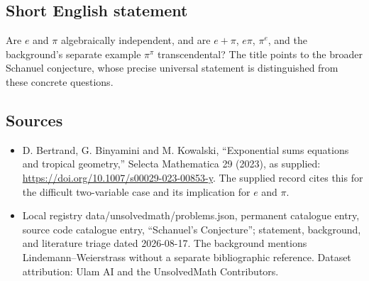\documentclass[11pt]{article}
\begin{document}
\subsection{Short English statement}
Are $e$ and $\pi$ algebraically independent, and are $e+\pi$, $e\pi$, $\pi^e$, and the background's separate example $\pi^\pi$ transcendental? The title points to the broader Schanuel conjecture, whose precise universal statement is distinguished from these concrete questions.
\subsection{Sources}
\begin{itemize}
\item D. Bertrand, G. Binyamini and M. Kowalski, ``Exponential sums equations and tropical geometry,'' Selecta Mathematica 29 (2023), as supplied: \url{https://doi.org/10.1007/s00029-023-00853-y}. The supplied record cites this for the difficult two-variable case and its implication for $e$ and $\pi$.
\item Local registry data/unsolvedmath/problems.json, permanent catalogue entry, source code catalogue entry, ``Schanuel's Conjecture''; statement, background, and literature triage dated 2026-08-17. The background mentions Lindemann--Weierstrass without a separate bibliographic reference. Dataset attribution: Ulam AI and the UnsolvedMath Contributors.
\end{itemize}
\end{document}
